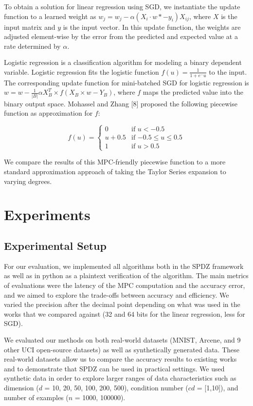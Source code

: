 \documentclass{article}
\begin{document}
To obtain a solution for linear regression using SGD, we instantiate the update function to a learned weight as $w_j = w_j  - \alpha(X_i \cdot w *-y_i)X_{ij}$, where $X$ is the input matrix and $y$ is the input vector. In this update function, the weights are adjusted element-wise by the error from the predicted and expected value at a rate determined by $\alpha$.

Logistic regression is a classification algorithm for modeling a binary dependent variable. Logistic regression fits the logistic function $f(u) = \frac{1}{1+e^-u}$ to the input. The corresponding update function for mini-batched SGD for logistic regression is $w = w - \frac{1}{|B|} \alpha X^{T}_{B} \times f(X_{B} \times w - Y_{B})$, where $f$ maps the predicted value into the binary output space. Mohassel and Zhang [8] proposed the following piecewise function as approximation for $f$:

\[
  f(u) =
  \begin{cases}
                                   0 & \text{if $u < -0.5$} \\
                                   u + 0.5 & \text{if $-0.5 \leq u \leq 0.5$} \\
1 & \text{if $u > 0.5$}
  \end{cases}
\]

We compare the results of this MPC-friendly piecewise function to a more standard approximation approach of taking the Taylor Series expansion to varying degrees.

\section{Experiments}

\subsection{Experimental Setup}

For our evaluation, we implemented all algorithms both in the SPDZ framework as well as in python as a plaintext verification of the algorithm.
The main metrics of evaluations were the latency of the MPC computation and the accuracy error, and we aimed to explore the trade-offs between accuracy and efficiency. We varied the precision after the decimal point 
depending on what was used in the works that we compared against (32 and 64 bits for the linear regression, less for SGD).

We evaluated our methods on both real-world datasets (MNIST, Arcene, and 9 other UCI open-source datasets) as well as synthetically generated data. These real-world datasets allow us to compare the accuracy results to existing works and to demonstrate that SPDZ can be used in practical settings. We used synthetic data in order to explore larger ranges of data characteristics such as dimension ($d$ = 10, 20, 50, 100, 200, 500), condition number ($cd$ = [1,10]), and number of examples ($n$ = 1000, 100000).
\end{document}
